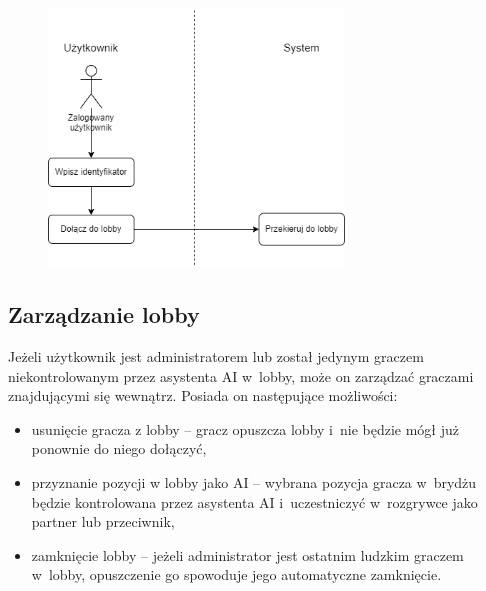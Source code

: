 \begin{figure}[h]
  \centering
  \includegraphics[width=0.7\textwidth]{img/schematy/join_lobby.png}
  \caption{}
\end{figure}

\FloatBarrier

\subsection{Zarządzanie lobby}

Jeżeli użytkownik jest administratorem lub został jedynym
graczem niekontrolowanym przez asystenta AI w~lobby, może on zarządzać graczami znajdującymi się
wewnątrz. Posiada on następujące możliwości:
\begin{itemize}
  \item usunięcie gracza z lobby -- gracz opuszcza lobby i~nie będzie
        mógł już ponownie do niego dołączyć,
  \item przyznanie pozycji w lobby jako AI -- wybrana pozycja
        gracza w~brydżu będzie kontrolowana przez asystenta AI
        i~uczestniczyć w~rozgrywce jako partner lub przeciwnik,
  \item zamknięcie lobby -- jeżeli administrator jest ostatnim ludzkim
        graczem w~lobby, opuszczenie go spowoduje jego automatyczne
        zamknięcie.

\end{itemize}

